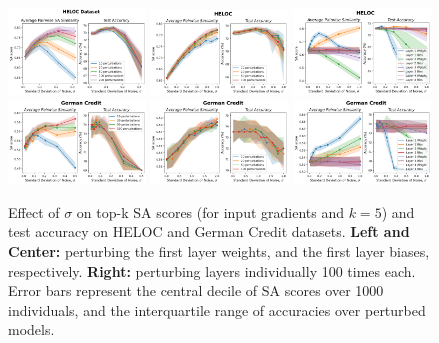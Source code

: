 \begin{figure}[b]
    \centering
    \includegraphics[width=0.325\textwidth]{figures/perturb_heloc_samples.png}
    \includegraphics[width=0.325\textwidth]{figures/perturb_heloc_samples_bias.png}
    \includegraphics[width=0.325\textwidth]{figures/perturb_heloc_layers.png}
    \includegraphics[width=0.325\textwidth]{figures/perturb_german_samples.png}
    \includegraphics[width=0.325\textwidth]{figures/perturb_german_samples_bias.png}
    \includegraphics[width=0.325\textwidth]{figures/perturb_german_layers.png}
    \caption{\small Effect of $\sigma$ on top-k SA scores (for input gradients and $k=5$) and test accuracy on HELOC and German Credit datasets. \textbf{Left and Center:} perturbing the first layer weights, and the first layer biases, respectively. \textbf{Right:} perturbing layers individually 100 times each. Error bars represent the central decile of SA scores over 1000 individuals, and the interquartile range of accuracies over perturbed models.}
    \label{fig:perturb1}
\end{figure}

